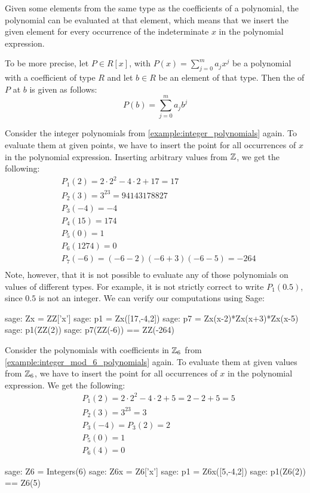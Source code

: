 Given some elements from the same type as the coefficients of a polynomial, the polynomial can be evaluated at that element, which means that we insert the given element for every occurrence of the indeterminate $x$ in the polynomial expression.

To be more precise, let $P\in R[x]$, with $P(x)=\sum_{j=0}^m a_j x^j$ be a polynomial with a coefficient of type $R$ and let $b\in R$ be an element of that type. Then the  of $P$ at $b$ is given as follows:
\begin{equation}
P(b) = \sum_{j=0}^m a_j b^j
\end{equation}
\begin{example}Consider the integer polynomials from \examplename{} \ref{example:integer_polynomials} again. To evaluate them at given points, we have to insert the point for all occurrences of $x$ in the polynomial expression. Inserting arbitrary values from $\mathbb{Z}$, we get the following:
\begin{align*}
 &P_1(2)    = 2\cdot 2^2 -4\cdot 2 +17 = 17 \\
 &P_2(3)    = 3^{23}=94143178827 \\
 &P_3(-4)   = -4 \\
 &P_4(15)   = 174 \\
 &P_5(0)    = 1 \\
 &P_6(1274) =0 \\
 &P_7(-6)   = (-6-2)(-6+3)(-6-5) = -264 \\
\end{align*}
Note, however, that it is not possible to evaluate any of those polynomials on values of different types. For example, it is not strictly correct to write $P_1(0.5)$, since $0.5$ is not an integer. We can verify our computations using  Sage:
\begin{sagecommandline}
sage: Zx = ZZ['x']
sage: p1 = Zx([17,-4,2])
sage: p7 = Zx(x-2)*Zx(x+3)*Zx(x-5)
sage: p1(ZZ(2))
sage: p7(ZZ(-6)) == ZZ(-264)
\end{sagecommandline}

\end{example}
\begin{example} Consider the polynomials with coefficients in $\mathbb{Z}_6$ from \examplename{} \ref{example:integer_mod_6_polynomials} again. To evaluate them at given values from $\mathbb{Z}_6$, we have to insert the point for all occurrences of $x$ in the polynomial expression. We get the following:
\begin{align*}
 & P_1(2)= 2\cdot 2^2 -4\cdot 2 +5 = 2 - 2 + 5 = 5\\
 &P_2(3)= 3^{23}=3\\
 &P_3(-4)= P_3(2) = 2\\
 &P_5(0)= 1\\
 &P_6(4)=0
\end{align*}
\begin{sagecommandline}
sage: Z6 = Integers(6)
sage: Z6x = Z6['x']
sage: p1 = Z6x([5,-4,2])
sage: p1(Z6(2)) == Z6(5)
\end{sagecommandline}

\end{example}
